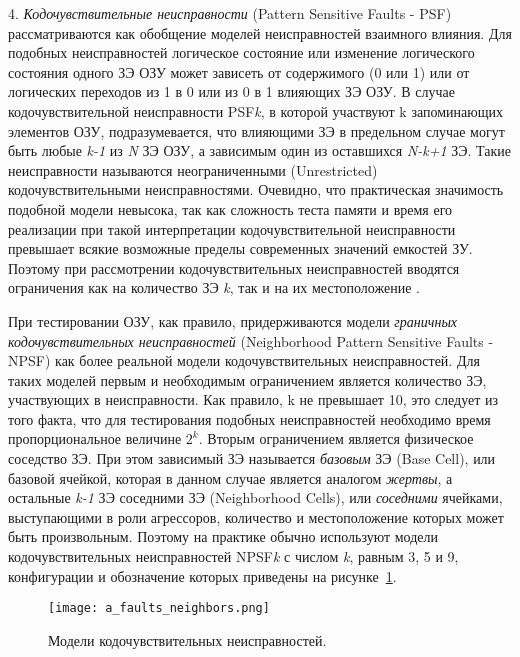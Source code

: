 4. \textit{Кодочувствительные неисправности} (Pattern Sensitive Faults - PSF) рассматриваются как обобщение моделей неисправностей взаимного влияния. Для подобных неисправностей логическое состояние или изменение логического состояния одного ЗЭ ОЗУ может зависеть от содержимого (0 или 1) или от логических переходов из 1 в 0 или из 0 в 1 влияющих ЗЭ ОЗУ. В случае кодочувствительной неисправности PSF\textit{k}, в которой участвуют k запоминающих элементов ОЗУ, подразумевается, что влияющими ЗЭ в предельном случае могут быть любые \textit{k-1} из \textit{N} ЗЭ ОЗУ, а зависимым один из оставшихся \textit{N-k+1} ЗЭ. Такие неисправности называются неограниченными (Unrestricted) кодочувствительными неисправностями. Очевидно, что практическая значимость подобной модели невысока, так как сложность теста памяти и время его реализации при такой интерпретации кодочувствительной неисправности превышает всякие возможные пределы современных значений емкостей ЗУ. Поэтому при рассмотрении кодочувствительных неисправностей вводятся ограничения как на количество ЗЭ \textit{k}, так и на их местоположение \cite{faults}. 

При тестировании ОЗУ, как правило, придерживаются модели \textit{граничных кодочувствительных неисправностей} (Neighborhood Pattern Sensitive Faults - NPSF) как более реальной модели кодочувствительных неисправностей. Для таких моделей первым и необходимым ограничением является количество ЗЭ, участвующих в неисправности. Как правило, k не превышает 10, это следует из того факта, что для тестирования подобных неисправностей необходимо время пропорциональное величине $2^k$.
Вторым ограничением является физическое соседство ЗЭ. При этом зависимый ЗЭ называется \textit{базовым} ЗЭ (Base Cell), или базовой ячейкой, которая в данном случае является аналогом \textit{жертвы}, а остальные \textit{k-1} ЗЭ соседними ЗЭ (Neighborhood Cells), или \textit{соседними} ячейками, выступающими в роли агрессоров, количество и местоположение которых может быть произвольным. Поэтому на практике обычно используют модели кодочувствительных неисправностей NPSF\textit{k} с числом \textit{k}, равным 3, 5 и 9, конфигурации и обозначение которых приведены на рисунке~\ref{fig:domain:faults:neighbors}. 

\begin{figure}[ht]
\centering
  \texttt{[image: a\_faults\_neighbors.png]}  
  \caption{ Модели кодочувствительных неисправностей. }
  \label{fig:domain:faults:neighbors}
\end{figure}

